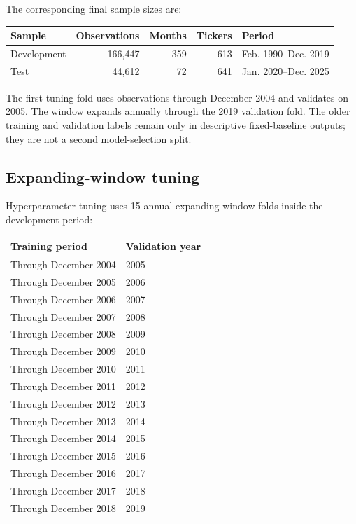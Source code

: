 \documentclass[11pt,a4paper]{article}
\begin{document}
The corresponding final sample sizes are:

\begin{center}
\small
\begin{tabularx}{0.94\textwidth}{p{2.7cm}r r r Y}
\toprule
Sample & Observations & Months & Tickers & Period \\
\midrule
Development & 166,447 & 359 & 613 & Feb. 1990--Dec. 2019 \\
Test & 44,612 & 72 & 641 & Jan. 2020--Dec. 2025 \\
\bottomrule
\end{tabularx}
\end{center}

The first tuning fold uses observations through December 2004 and validates on
2005. The window expands annually through the 2019 validation fold. The older
training and validation labels remain only in descriptive fixed-baseline
outputs; they are not a second model-selection split.

\subsection{Expanding-window tuning}

Hyperparameter tuning uses 15 annual expanding-window folds inside the
development period:

\begin{center}
\small
\begin{tabularx}{0.82\textwidth}{p{4.6cm}Y}
\toprule
Training period & Validation year \\
\midrule
Through December 2004 & 2005 \\
Through December 2005 & 2006 \\
Through December 2006 & 2007 \\
Through December 2007 & 2008 \\
Through December 2008 & 2009 \\
Through December 2009 & 2010 \\
Through December 2010 & 2011 \\
Through December 2011 & 2012 \\
Through December 2012 & 2013 \\
Through December 2013 & 2014 \\
Through December 2014 & 2015 \\
Through December 2015 & 2016 \\
Through December 2016 & 2017 \\
Through December 2017 & 2018 \\
Through December 2018 & 2019 \\
\bottomrule
\end{tabularx}
\end{center}
\end{document}

